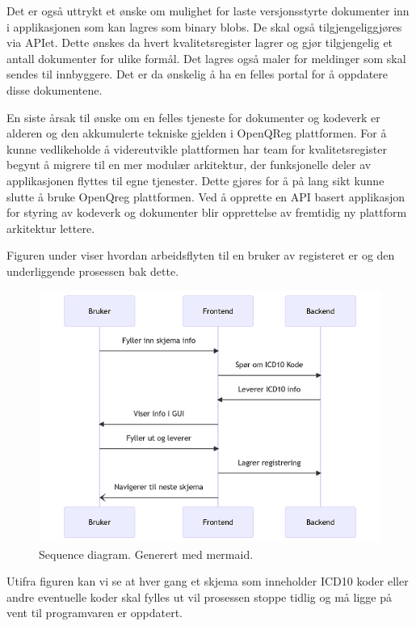 Det er også uttrykt et ønske om mulighet for laste versjonsstyrte dokumenter inn i applikasjonen som kan lagres som binary
blobs. De skal også tilgjengeliggjøres via APIet. Dette ønskes da hvert kvalitetsregister lagrer og gjør tilgjengelig et antall
dokumenter for ulike formål. Det lagres også maler for meldinger som skal sendes til innbyggere. Det er da ønskelig å ha en
felles portal for å oppdatere disse dokumentene.

En siste årsak til ønske om en felles tjeneste for dokumenter og kodeverk er alderen og den akkumulerte tekniske gjelden i OpenQReg plattformen. For å kunne vedlikeholde å videreutvikle
plattformen har team for kvalitetsregister begynt å migrere til en mer modulær arkitektur, der funksjonelle deler av applikasjonen flyttes til egne tjenester.
Dette gjøres for å på lang sikt kunne slutte å bruke OpenQreg plattformen. Ved å opprette en API basert applikasjon for styring av kodeverk og dokumenter blir opprettelse av fremtidig
ny plattform arkitektur lettere.

Figuren under viser hvordan arbeidsflyten til en bruker av registeret er og den underliggende prosessen bak dette.

\begin{figure}[ht]
\centering
\includegraphics{images/sequence-diagram1.png}
\caption{Sequence diagram. Generert med mermaid.}
\label{fig:sequence-diagram}
\end{figure}

Utifra figuren kan vi se at hver gang et skjema som inneholder ICD10 koder eller andre eventuelle koder skal fylles ut vil prosessen stoppe tidlig og må ligge på vent til programvaren er oppdatert.

